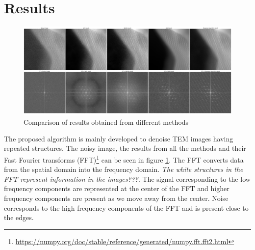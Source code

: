 \documentclass[fleqn,10pt]{wlscirep}
\begin{document}
	\section*{Results}
	
	\begin{figure}
		\centering
		\includegraphics[scale=0.09]{./imgs/comparison.jpg}
		\caption{Comparison of results obtained from different methods}
		\label{fig:comparison}
	\end{figure}
	
	
	The proposed algorithm is mainly developed to denoise TEM images having repeated structures. The noisy image, the results from all the methods and their Fast Fourier transforms (FFT)\footnote{\url{https://numpy.org/doc/stable/reference/generated/numpy.fft.fft2.html}} can be seen in figure \ref{fig:comparison}. The FFT converts data from the spatial domain into the frequency domain. \textit{The white structures in the FFT represent information in the images???}. The signal corresponding to the low frequency components are represented at the center of the FFT and higher frequency components are present as we move away from the center. Noise corresponds to the high frequency components of the FFT and is present close to the edges.
	
\end{document}
